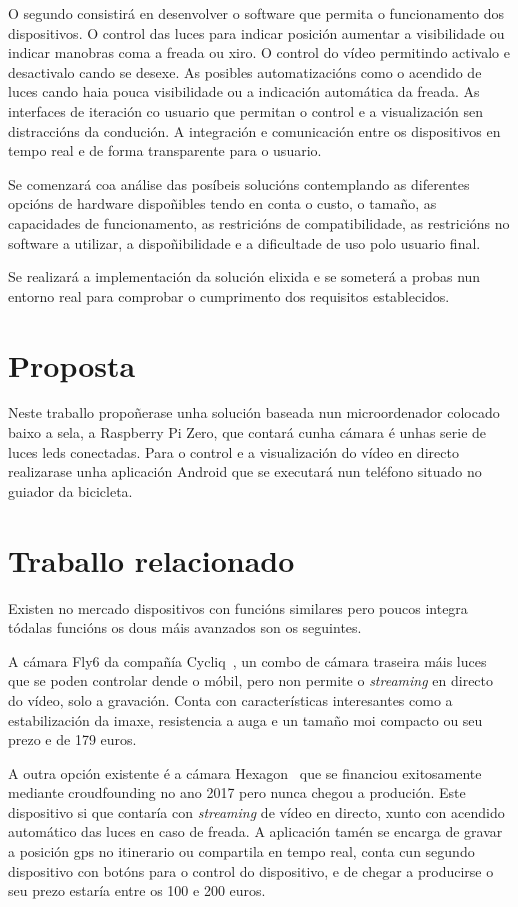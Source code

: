 O segundo consistirá en desenvolver o software que permita o funcionamento dos dispositivos. O control das luces para indicar posición aumentar a visibilidade ou indicar manobras coma a freada ou xiro. O control do vídeo permitindo activalo e desactivalo cando se desexe. As posibles automatizacións como o acendido de luces cando haia pouca visibilidade ou a indicación automática da freada. As interfaces de iteración co usuario que permitan o control e a visualización sen distraccións da condución. A integración e comunicación entre os dispositivos en tempo real e de forma transparente para o usuario.

Se comenzará coa análise das posíbeis solucións contemplando as diferentes opcións de hardware dispoñibles tendo en conta o custo, o tamaño, as capacidades de funcionamento, as restricións de compatibilidade, as restricións no software a utilizar, a dispoñibilidade e a dificultade de uso polo usuario final.

Se realizará a implementación da solución elixida e se someterá a probas nun entorno real para comprobar o cumprimento dos requisitos establecidos.


\section{Proposta}
Neste traballo propoñerase unha solución baseada nun microordenador colocado baixo a sela, a Raspberry Pi Zero, que contará cunha cámara é unhas serie de luces leds conectadas. Para o control e a visualización do vídeo en directo realizarase unha aplicación Android que se executará nun teléfono situado no guiador da bicicleta.


\section{Traballo relacionado}
Existen no mercado dispositivos con funcións similares pero poucos integra tódalas funcións os dous máis avanzados son os seguintes.

 A cámara Fly6 da compañía Cycliq~\cite{Fly6CERear}, un combo de cámara traseira máis luces que se poden controlar dende o móbil, pero non permite o \emph{streaming} en directo do vídeo, solo a gravación. Conta con características interesantes como a estabilización da imaxe, resistencia a auga e un tamaño moi compacto ou seu prezo e de 179 euros.

 A outra opción existente é a cámara Hexagon~\cite{HEXAGONCameraSignals} que se financiou exitosamente mediante croudfounding no ano 2017 pero nunca chegou a produción. Este dispositivo si que contaría con \emph{streaming} de vídeo en directo, xunto con acendido automático das luces en caso de freada. A aplicación tamén se encarga de gravar a posición gps no itinerario ou compartila en tempo real, conta cun segundo dispositivo con botóns para o control do dispositivo, e de chegar a producirse o seu prezo estaría entre os 100 e 200 euros.

